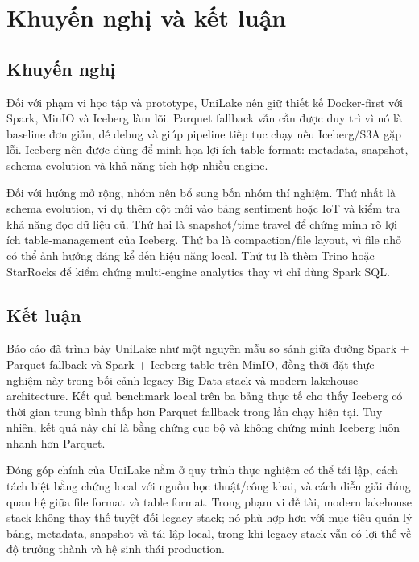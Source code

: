 \section{Khuyến nghị và kết luận}

\subsection{Khuyến nghị}

Đối với phạm vi học tập và prototype, UniLake nên giữ thiết kế Docker-first với Spark, MinIO và Iceberg làm lõi. Parquet fallback vẫn cần được duy trì vì nó là baseline đơn giản, dễ debug và giúp pipeline tiếp tục chạy nếu Iceberg/S3A gặp lỗi. Iceberg nên được dùng để minh họa lợi ích table format: metadata, snapshot, schema evolution và khả năng tích hợp nhiều engine.

Đối với hướng mở rộng, nhóm nên bổ sung bốn nhóm thí nghiệm. Thứ nhất là schema evolution, ví dụ thêm cột mới vào bảng sentiment hoặc IoT và kiểm tra khả năng đọc dữ liệu cũ. Thứ hai là snapshot/time travel để chứng minh rõ lợi ích table-management của Iceberg. Thứ ba là compaction/file layout, vì file nhỏ có thể ảnh hưởng đáng kể đến hiệu năng local. Thứ tư là thêm Trino hoặc StarRocks để kiểm chứng multi-engine analytics thay vì chỉ dùng Spark SQL.

\subsection{Kết luận}

Báo cáo đã trình bày UniLake như một nguyên mẫu so sánh giữa đường Spark + Parquet fallback và Spark + Iceberg table trên MinIO, đồng thời đặt thực nghiệm này trong bối cảnh legacy Big Data stack và modern lakehouse architecture. Kết quả benchmark local trên ba bảng thực tế cho thấy Iceberg có thời gian trung bình thấp hơn Parquet fallback trong lần chạy hiện tại. Tuy nhiên, kết quả này chỉ là bằng chứng cục bộ và không chứng minh Iceberg luôn nhanh hơn Parquet.

Đóng góp chính của UniLake nằm ở quy trình thực nghiệm có thể tái lập, cách tách biệt bằng chứng local với nguồn học thuật/công khai, và cách diễn giải đúng quan hệ giữa file format và table format. Trong phạm vi đề tài, modern lakehouse stack không thay thế tuyệt đối legacy stack; nó phù hợp hơn với mục tiêu quản lý bảng, metadata, snapshot và tái lập local, trong khi legacy stack vẫn có lợi thế về độ trưởng thành và hệ sinh thái production.
